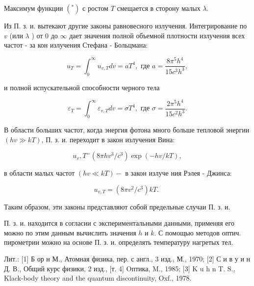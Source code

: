 \documentclass[10pt]{article}
\begin{document}
Максимум функции $\left({ }^{*}\right)$ с ростом $T$ смещается в сторону малых $\lambda$.



Из П. з. и. вытекают другие законы равновесного излучения. Интегрирование по $v$ (или $\lambda$ ) от 0 до $\infty$ дает значения полной объемной плотности излучения всех частот - за кон излучения Стефана - Больцмана:



\[

u_{T}=\int_{0}^{\infty} u_{v, T} d v=a T^{4}, \text { где } a=\frac{8 \pi^{5} h^{4}}{15 c^{3} h^{3}},

\]



и полной испускательной способности черного тела



\[

\varepsilon_{T}=\int_{0}^{\infty} \varepsilon_{v, T} d v=\sigma T^{4}, \text { где } \sigma=\frac{2 \pi^{5} h^{4}}{15 c^{2} h^{3}} .

\]



В области больших частот, когда энергия фотона много больше тепловой энергии $(h v \gg k T)$, П. з. и. переходит в закон излучения Вина:



\[

u_{v}, T^{=}\left(8 \pi h v^{3} / c^{3}\right) \exp (-h v / k T),

\]



в области малых частот $(h v \ll k T)-$ в закон излуче ния Рэлея - Джинса:



\[

u_{v, T}=\left(8 \pi v^{2} / c^{3}\right) k T \text {. }

\]



Таким образом, эти законы представляют собой предельные случаи П. з. и.



П. з. и. находится в согласии с экспериментальными данными, применяя его можно по этим данным вычислить значения $h$ и $k$. С помощью методов оптич. пирометрии можно на основе П. з. и. определять температуру нагретых тел.



Лит.: [1] Б ор н М., Атомная физика, пер. с англ., 3 изд., М., 1970; [2] С и в у и н Д. В., Общий курс физики, 2 изд., [т. 4] Oптика, M., 1985; [3] K u h n T. S., Klack-body theory and the quantum discontinuity, Oxf., 1978.
\end{document}
